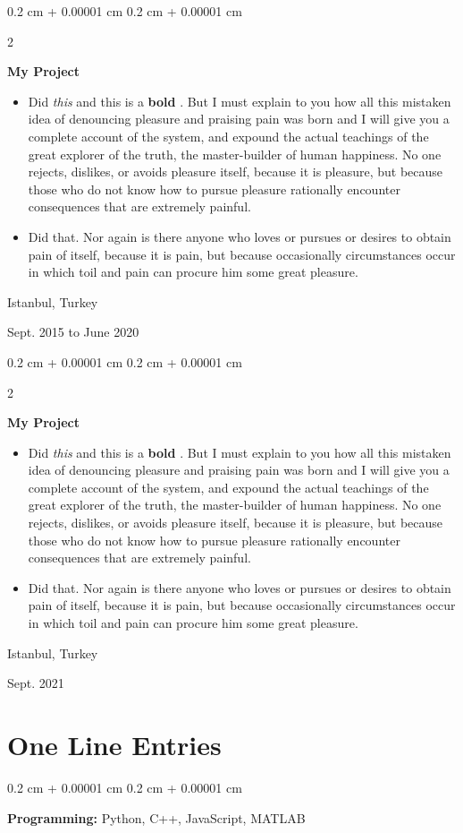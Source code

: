 \documentclass[10pt, letterpaper]{article}
\newenvironment{highlights}{
    \begin{itemize}[
        topsep=0.10 cm,
        parsep=0.10 cm,
        partopsep=0pt,
        itemsep=0pt,
        leftmargin=0.4 cm + 10pt
    ]
}{
    \end{itemize}
} %
\newenvironment{onecolentry}{
    \begin{adjustwidth}{
        0.2 cm + 0.00001 cm
    }{
        0.2 cm + 0.00001 cm
    }
}{
    \end{adjustwidth}
} %
\newenvironment{twocolentry}[2][]{
    \onecolentry
    \def\secondColumn{#2}
    \setcolumnwidth{\fill, 4.5 cm}
    \begin{paracol}{2}
}{
    \switchcolumn \raggedleft \secondColumn
    \end{paracol}
    \endonecolentry
} %
\let\hrefWithoutArrow\href
\renewcommand{\href}[2]{\hrefWithoutArrow{#1}{\mbox{\ifthenelse{\equal{#2}{}}{ }{#2 }\raisebox{.15ex}{\footnotesize \faExternalLink*}}}}
\begin{document}
        \vspace{0.2 cm}

        \begin{twocolentry}{
            Istanbul, Turkey

        Sept. 2015 to June 2020
        }
            \textbf{My Project}
            \begin{highlights}
                \item Did \textit{this} and this is a \textbf{bold} \href{https://example.com}{link}. But I must explain to you how all this mistaken idea of denouncing pleasure and praising pain was born and I will give you a complete account of the system, and expound the actual teachings of the great explorer of the truth, the master-builder of human happiness. No one rejects, dislikes, or avoids pleasure itself, because it is pleasure, but because those who do not know how to pursue pleasure rationally encounter consequences that are extremely painful.
                \item Did that. Nor again is there anyone who loves or pursues or desires to obtain pain of itself, because it is pain, but because occasionally circumstances occur in which toil and pain can procure him some great pleasure.
            \end{highlights}
        \end{twocolentry}


        \vspace{0.2 cm}

        \begin{twocolentry}{
            Istanbul, Turkey

        Sept. 2021
        }
            \textbf{My Project}
            \begin{highlights}
                \item Did \textit{this} and this is a \textbf{bold} \href{https://example.com}{link}. But I must explain to you how all this mistaken idea of denouncing pleasure and praising pain was born and I will give you a complete account of the system, and expound the actual teachings of the great explorer of the truth, the master-builder of human happiness. No one rejects, dislikes, or avoids pleasure itself, because it is pleasure, but because those who do not know how to pursue pleasure rationally encounter consequences that are extremely painful.
                \item Did that. Nor again is there anyone who loves or pursues or desires to obtain pain of itself, because it is pain, but because occasionally circumstances occur in which toil and pain can procure him some great pleasure.
            \end{highlights}
        \end{twocolentry}



    
    \section{One Line Entries}



        
        \begin{onecolentry}
            \textbf{Pro\textnormal{gram}ming:} Python, C++, JavaScript, MATLAB
        \end{onecolentry}


    
\end{document}
